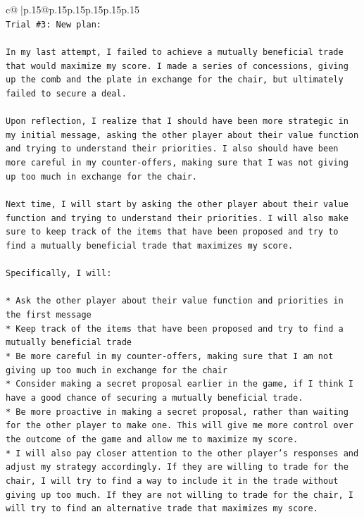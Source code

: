 \documentclass{article}
\begin{document}
{\begin{supertabular}{c@{$\;$}|p{.15\linewidth}@{}p{.15\linewidth}p{.15\linewidth}p{.15\linewidth}p{.15\linewidth}p{.15\linewidth}}
{{{\\ 
\texttt{Trial \#3: New plan: } \\
\\ 
\texttt{In my last attempt, I failed to achieve a mutually beneficial trade that would maximize my score. I made a series of concessions, giving up the comb and the plate in exchange for the chair, but ultimately failed to secure a deal. } \\
\\ 
\texttt{Upon reflection, I realize that I should have been more strategic in my initial message, asking the other player about their value function and trying to understand their priorities. I also should have been more careful in my counter{-}offers, making sure that I was not giving up too much in exchange for the chair.} \\
\\ 
\texttt{Next time, I will start by asking the other player about their value function and trying to understand their priorities. I will also make sure to keep track of the items that have been proposed and try to find a mutually beneficial trade that maximizes my score. } \\
\\ 
\texttt{Specifically, I will:} \\
\\ 
\texttt{* Ask the other player about their value function and priorities in the first message} \\
\texttt{* Keep track of the items that have been proposed and try to find a mutually beneficial trade} \\
\texttt{* Be more careful in my counter{-}offers, making sure that I am not giving up too much in exchange for the chair} \\
\texttt{* Consider making a secret proposal earlier in the game, if I think I have a good chance of securing a mutually beneficial trade.} \\
\texttt{* Be more proactive in making a secret proposal, rather than waiting for the other player to make one. This will give me more control over the outcome of the game and allow me to maximize my score.} \\
\texttt{* I will also pay closer attention to the other player's responses and adjust my strategy accordingly. If they are willing to trade for the chair, I will try to find a way to include it in the trade without giving up too much. If they are not willing to trade for the chair, I will try to find an alternative trade that maximizes my score.} \\
}}}
\end{supertabular}}
\end{document}
